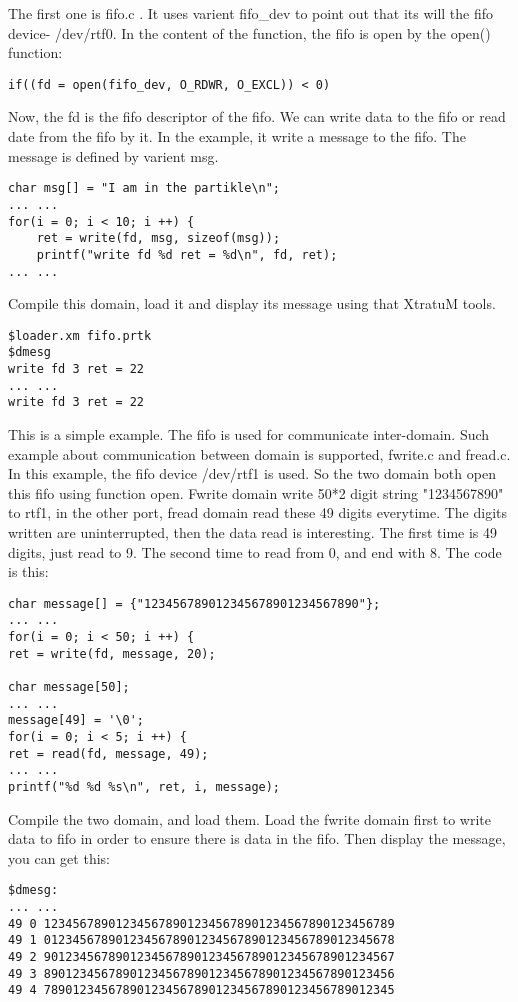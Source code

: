 The first one is fifo.c . It uses varient fifo\_dev to point out that its will the fifo device- /dev/rtf0. In the content of the function, the fifo is open by the open() function:
\begin{verbatim}
if((fd = open(fifo_dev, O_RDWR, O_EXCL)) < 0)
\end{verbatim}
Now, the fd is the fifo descriptor of the fifo. We can write data to the fifo or read date from the fifo by it. In the example, it write a message to the fifo. The message is defined by varient msg.
\begin{verbatim}
char msg[] = "I am in the partikle\n";
... ...
for(i = 0; i < 10; i ++) {
    ret = write(fd, msg, sizeof(msg));
    printf("write fd %d ret = %d\n", fd, ret);
... ...
\end{verbatim}
Compile this domain, load it and display its message using that XtratuM tools.
\begin{verbatim}
$loader.xm fifo.prtk
$dmesg
write fd 3 ret = 22
... ...
write fd 3 ret = 22
\end{verbatim}

This is a simple example. The fifo is used for communicate inter-domain. Such example about communication between domain is supported, fwrite.c and fread.c. In this example, the fifo device /dev/rtf1 is used. So the two domain both open this fifo using function open. Fwrite domain write 50*2 digit string "1234567890" to rtf1, in the other port, fread domain read these 49 digits everytime. The digits written are uninterrupted, then the data read is interesting. The first time is 49 digits, just read to 9. The second time to read from 0, and end with 8. The code is this:
\begin{lstlisting}
char message[] = {"123456789012345678901234567890"};
... ...
for(i = 0; i < 50; i ++) {
ret = write(fd, message, 20);

char message[50];
... ...
message[49] = '\0';
for(i = 0; i < 5; i ++) {
ret = read(fd, message, 49);
... ...
printf("%d %d %s\n", ret, i, message);
\end{lstlisting}

Compile the two domain, and load them. Load the fwrite domain first to write data to fifo in order to ensure there is data in the fifo. Then display the message, you can get this:
\begin{verbatim}
$dmesg:
... ...
49 0 1234567890123456789012345678901234567890123456789
49 1 0123456789012345678901234567890123456789012345678
49 2 9012345678901234567890123456789012345678901234567
49 3 8901234567890123456789012345678901234567890123456
49 4 7890123456789012345678901234567890123456789012345
\end{verbatim}


